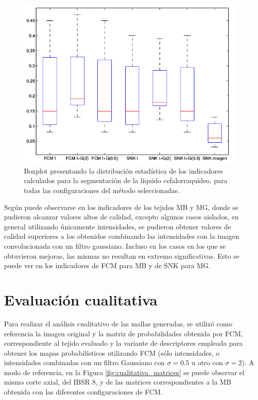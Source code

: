 \begin{figure}[H]
	\centering
	\includegraphics[scale=0.5]{images/BoxPlotLC.png}
	\caption{Boxplot presentando la distribución estadística de los indicadores calculados para la segmentación de la líquido cefalorraquídeo, para todas las configuraciones del método seleccionadas.}
	\label{fig:boxplotLC}
\end{figure}

Según puede observarse en los indicadores de los tejidos MB y MG, donde se pudieron alcanzar valores altos de calidad, excepto algunos casos aislados, en general utilizando únicamente intensidades, se pudieron obtener valores de calidad superiores a los obtenidos combinando las intensidades con la imagen convolucionada con un filtro gaussiano. Incluso en los casos en los que se obtuvieron mejoras, las mismas no resultan en extremo significativas. Esto se puede ver en los indicadores de FCM para MB y de SNK para MG.

\section{Evaluación cualitativa}\label{section:evaluacion_cualitativa}
Para realizar el análisis cualitativo de las mallas generadas, se utilizó como referencia la imagen original y la matriz de probabilidades obtenida por FCM, correspondiente al tejido evaluado y la variante de descriptores empleada para obtener los mapas probabilísticos utilizando FCM (sólo intensidades, o intensidades combinadas con un filtro Gaussiano con $\sigma = 0.5$ u otro con $\sigma = 2$).
A modo de referencia, en la Figura \ref{fig:cualitativa_matrices} se puede observar el mismo corte axial, del IBSR 8, y de las matrices correspondientes a la MB obtenida con las diferentes configuraciones de FCM.

